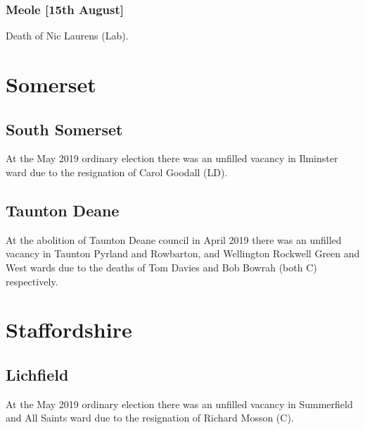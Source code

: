 \documentclass[a4paper,openany]{book}
\begin{document}
\begin{resultsiii}
\subsubsection*{Meole \hspace*{\fill}\nolinebreak[1]%
	\enspace\hspace*{\fill}
	[15th August]}


Death of Nic Laurens (Lab).

\section{Somerset}

\subsection*{South Somerset}

At the May 2019 ordinary election there was an unfilled vacancy in Ilminster ward due to the resignation of Carol Goodall (LD).

\subsection*{Taunton Deane}

At the abolition of Taunton Deane council in April 2019 there was an unfilled vacancy in Taunton Pyrland and Rowbarton, and Wellington Rockwell Green and West wards due to the deaths of Tom Davies and Bob Bowrah (both C) respectively.

\section{Staffordshire}

\subsection*{Lichfield}

At the May 2019 ordinary election there was an unfilled vacancy in Summerfield and All Saints ward due to the resignation of Richard Mosson (C).


\end{resultsiii}
\end{document}
